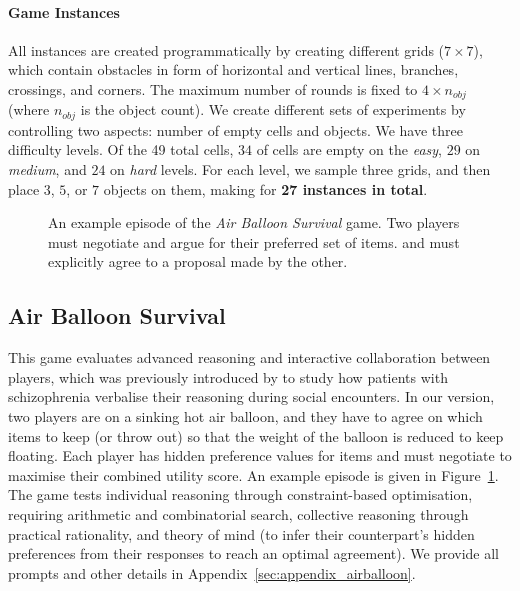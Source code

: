\documentclass[11pt]{article}
\begin{document}
\paragraph{Game Instances}

All instances are created programmatically by creating different grids ($7\times7$), which contain obstacles in form of horizontal and vertical lines, branches, crossings, and corners. The maximum number of rounds is fixed to $4 \times n_{obj}$ (where $n_{obj}$ is the object count). 
We create different sets of experiments by controlling two aspects: number of empty cells and objects. We have three difficulty levels. Of the 49 total cells, $34$ of cells are empty on the \textit{easy}, $29$ on \textit{medium}, and $24$ on \textit{hard} levels. For each level, we sample three grids, and then place $3$, $5$, or $7$ objects on them, making for \textbf{27 instances in total}.

\begin{figure}[ht]
    \centering
    
    \caption{An example episode of the \textit{Air Balloon Survival} game. Two players must negotiate and argue for their preferred set of items. and must explicitly agree to a proposal made by the other.}
    \label{fig:air_balloon_example}
    \vspace*{-.6cm}
\end{figure}

\subsection{Air Balloon Survival}
This game evaluates advanced reasoning and interactive collaboration between players, which was previously introduced by \citet{howes2021justifiable} to study how patients with schizophrenia verbalise their reasoning during social encounters. In our version, two players are on a sinking hot air balloon, and they have to agree on which items to keep (or throw out) so that the weight of the balloon is reduced to keep floating. Each player has hidden preference values for items and must negotiate to maximise their combined utility score. An example episode is given in Figure~\ref{fig:air_balloon_example}. The game tests individual reasoning through constraint-based optimisation, requiring arithmetic and combinatorial search, collective reasoning through practical rationality, and theory of mind (to infer their counterpart's hidden preferences from their responses to reach an optimal agreement). We provide all prompts and other details in Appendix~\ref{sec:appendix_airballoon}.
\end{document}
